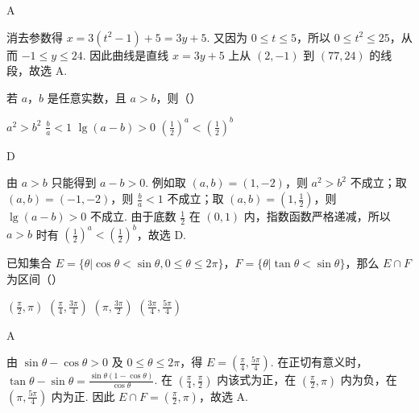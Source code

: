 \documentclass[UTF8,a4paper,oneside,11pt]{ctexbook}
\begin{document}
\begin{answer}
A
\end{answer}

\begin{solution}
消去参数得 \(x=3(t^2-1)+5=3y+5\). 又因为
\(0\leqslant t\leqslant5\)，所以 \(0\leqslant t^2\leqslant25\)，从而
\(-1\leqslant y\leqslant24\). 因此曲线是直线
\(x=3y+5\) 上从 \((2,-1)\) 到 \((77,24)\) 的线段，故选 A.
\end{solution}

\begin{problem}
若 \(a\)，\(b\) 是任意实数，且 \(a > b\)，则（\quad）

\choices
    {\(a^2 > b^2\)}
    {\(\frac{b}{a} < 1\)}
    {\(\lg (a - b) > 0\)}
    {\(\left(\frac{1}{2}\right)^a < \left(\frac{1}{2}\right)^b\)}
\end{problem}

\begin{answer}
D
\end{answer}

\begin{solution}
由 \(a>b\) 只能得到 \(a-b>0\). 例如取 \((a,b)=(1,-2)\)，则
\(a^2>b^2\) 不成立；取 \((a,b)=(-1,-2)\)，则
\(\frac{b}{a}<1\) 不成立；取 \((a,b)=(1,\frac{1}{2})\)，则
\(\lg(a-b)>0\) 不成立. 由于底数
\(\frac{1}{2}\) 在 \((0,1)\) 内，指数函数严格递减，所以
\(a>b\) 时有
\(\left(\frac{1}{2}\right)^a<\left(\frac{1}{2}\right)^b\)，故选 D.
\end{solution}

\begin{problem}
已知集合 \(E = \{\theta | \cos \theta < \sin \theta, 0 \leqslant \theta \leqslant 2\pi\}\)，\(F = \{\theta | \tan \theta < \sin \theta\}\)，那么 \(E \cap F\) 为区间（\quad）

\choices
    {\(\left(\frac{\pi}{2},\pi\right)\)}
    {\(\left(\frac{\pi}{4},\frac{3\pi}{4}\right)\)}
    {\(\left(\pi,\frac{3\pi}{2}\right)\)}
    {\(\left(\frac{3\pi}{4},\frac{5\pi}{4}\right)\)}
\end{problem}

\begin{answer}
A
\end{answer}

\begin{solution}
由 \(\sin\theta-\cos\theta>0\) 及 \(0\leqslant\theta\leqslant2\pi\)，得
\(E=\left(\frac{\pi}{4},\frac{5\pi}{4}\right)\). 在正切有意义时，
\(\tan\theta-\sin\theta=\frac{\sin\theta(1-\cos\theta)}{\cos\theta}\).
在 \(\left(\frac{\pi}{4},\frac{\pi}{2}\right)\) 内该式为正，在
\(\left(\frac{\pi}{2},\pi\right)\) 内为负，在
\(\left(\pi,\frac{5\pi}{4}\right)\) 内为正. 因此
\(E\cap F=\left(\frac{\pi}{2},\pi\right)\)，故选 A.
\end{solution}
\end{document}
